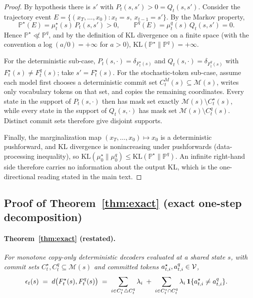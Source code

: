 \begin{proof}
By hypothesis there is $s'$ with $P_{t}(s,s')>0=Q_{t}(s,s')$. Consider the trajectory event
$E=\{(x_{T},\dots,x_{0}):x_{t}=s,\ x_{t-1}=s'\}$. By the Markov property,
\[
\mathbb{P}^{\star}(E)=\mu^{\star}_{t}(s)\,P_{t}(s,s')>0,
\qquad
\mathbb{P}^{q}(E)=\mu^{q}_{t}(s)\,Q_{t}(s,s')=0 .
\]
Hence $\mathbb{P}^{\star}\not\ll\mathbb{P}^{q}$, and by the definition of KL divergence on a finite
space (with the convention $a\log(a/0)=+\infty$ for $a>0$),
$\mathrm{KL}(\mathbb{P}^{\star}\|\mathbb{P}^{q})=+\infty$.

For the deterministic sub-case, $P_{t}(s,\cdot)=\delta_{F^{\star}_{t}(s)}$ and
$Q_{t}(s,\cdot)=\delta_{F^{q}_{t}(s)}$ with $F^{\star}_{t}(s)\neq F^{q}_{t}(s)$; take
$s'=F^{\star}_{t}(s)$. For the stochastic-token sub-case, assume each model first chooses a deterministic commit set
$C_t^M(s)\subseteq\mathcal M(s)$, writes only vocabulary tokens on that set, and copies the
remaining coordinates. Every state in the support of $P_t(s,\cdot)$ then has mask set exactly
$\mathcal M(s)\setminus C_t^\star(s)$, while every state in the support of $Q_t(s,\cdot)$ has mask
set $\mathcal M(s)\setminus C_t^q(s)$. Distinct commit sets therefore give disjoint supports.

Finally, the marginalization map $(x_{T},\dots,x_{0})\mapsto x_{0}$ is a deterministic
pushforward, and KL divergence is nonincreasing under pushforwards (data-processing inequality),
so $\mathrm{KL}(\mu^{\star}_{0}\|\mu^{q}_{0})\le\mathrm{KL}(\mathbb{P}^{\star}\|\mathbb{P}^{q})$.
An infinite right-hand side therefore carries no information about the output KL, which is the
one-directional reading stated in the main text.
\end{proof}

\subsection{Proof of Theorem~\ref{thm:exact} (exact one-step decomposition)}
\label{app:proofs:action}

\paragraph{Theorem~\ref{thm:exact} (restated).}
\emph{For monotone copy-only deterministic decoders evaluated at a shared state $s$, with commit
sets $C^{\star}_{t},C^{q}_{t}\subseteq\mathcal{M}(s)$ and committed tokens
$a^{\star}_{t,i},a^{q}_{t,i}\in\mathcal{V}$,}
\[
\epsilon_{t}(s)\;=\;d\big(F^{\star}_{t}(s),F^{q}_{t}(s)\big)
\;=\;\sum_{i\in C^{\star}_{t}\triangle C^{q}_{t}}\lambda_{i}
\;+\;\sum_{i\in C^{\star}_{t}\cap C^{q}_{t}}\lambda_{i}\,\mathbf{1}\{a^{\star}_{t,i}\neq a^{q}_{t,i}\} .
\]

